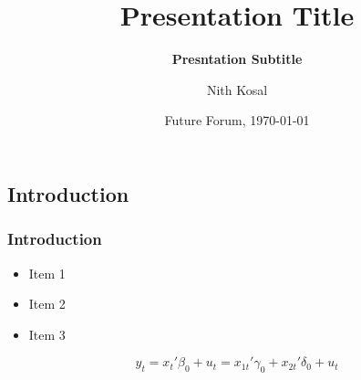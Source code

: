 \documentclass[11pt]{beamer}
\begin{document}
	\author[Nith Kosal]{Nith Kosal}
	\title[Presentation Title]{\bfseries Presentation Title}
	\subtitle{\bfseries Presntation Subtitle}

	
	\date[\today]{Future Forum, \today}

	\begin{frame}[plain]
		\maketitle
		
	\end{frame}
	\setcounter{framenumber}{0}
	\begin{frame}
		\section{Introduction}
		\frametitle{\bfseries Introduction}
		
		\begin{itemize}
			\item Item 1 \citep{Altunbas2001, Bareille2018}
			\item Item 2
			\item Item 3
		\end{itemize}
	\hyperlink{map}{}
	
	\begin{equation}
		y_{t} = x_{t}'\beta_{0} + u_{t} = x_{1t}'\gamma_{0}+x_{2t}'\delta_{0} + u_{t}
		
	\end{equation}
	\end{frame}
	
\end{document}
